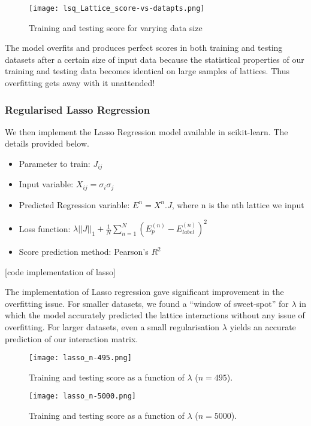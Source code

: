 \begin{figure}[H]
    \centering
    \texttt{[image: lsq\_Lattice\_score-vs-datapts.png]}
    \caption{Training and testing score for varying data size}
    \label{fig:lsqscore}
\end{figure}

The model overfits and produces perfect scores in both training and testing datasets after a certain size of input data because the statistical properties of our training and testing data becomes identical on large samples of lattices.
Thus overfitting gets away with it unattended!

\subsubsection{Regularised Lasso Regression}
We then implement the Lasso Regression model available in scikit-learn. The details provided below.
\begin{itemize}
    \item Parameter to train: \(J_{ij}\)
    \item Input variable: \(X_{ij}=\sigma_i\sigma_j\)
    \item Predicted Regression variable: \(E^n=X^n.J\), where n is the nth lattice we input
    \item Loss function: \(\lambda ||J||_1 + \frac{1}{N} \sum_{n=1}^N(E_p^{(n)}-E_{label}^{(n)})^2\)
    \item Score prediction method: Pearson's \(R^2\)
\end{itemize}

[code implementation of lasso]

The implementation of Lasso regression gave significant improvement in the overfitting issue.
For smaller datasets, we found a ``window of sweet-spot'' for \(\lambda\) in which the model accurately predicted the lattice interactions without any issue of overfitting.
For larger datasets, even a small regularisation \(\lambda\) yields an accurate prediction of our interaction matrix.

\begin{figure}[h!]
    \centering
    \texttt{[image: lasso\_n-495.png]}
    \caption{Training and testing score as a function of \( \lambda \) (\( n=495 \)).}
\end{figure}


\begin{figure}[h!]
    \centering
    \texttt{[image: lasso\_n-5000.png]}
    \caption{Training and testing score as a function of \( \lambda \) (\( n=5000 \)).}
\end{figure}


